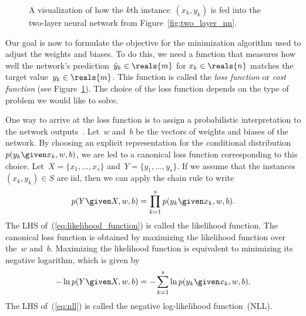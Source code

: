 \documentclass[11pt,a4paper]{article}
\numberwithin{equation}{section}
\begin{document}
\begin{figure}
\caption{A visualization of how the $k$th instance~$(x_k, y_k)$ is fed into the
two-layer neural network from
Figure~\ref{fig:two_layer_nn}.\label{fig:nn_with_loss}}
\end{figure}

Our goal is now to formulate the objective for the minimization algorithm used
to adjust the weights and biases. To do this, we need a function that measures
how well the network's prediction~$\hat{y}_k \in \reals{m}$ for $x_k \in
\reals{n}$ matches the target value~$y_k \in \reals{m}$. This function is called
the \emph{loss function} or \emph{cost function} (see
Figure~\ref{fig:nn_with_loss}). The choice of the loss function depends on the
type of problem we would like to solve.

One way to arrive at the loss function is to assign a probabilistic
interpretation to the network outputs~\citep{ml_bishop}. Let~$w$ and~$b$ be the
vectors of weights and biases of the network. By choosing an explicit
representation for the conditional distribution~$p(y_k \given x_k, w, b)$, we
are led to a canonical loss function corresponding to this choice. Let~$X =
\{x_1, \ldots, x_s\}$ and~$Y = \{y_1, \ldots, y_s\}$. If we assume that the
instances~$(x_k, y_k) \in S$ are iid, then we can apply the chain rule to write
\[
	p(Y \given X, w, b) = \prod_{k = 1}^s p(y_k \given x_k, w, b).
	\label{eq:likelihood_function}
\]
The LHS of~(\ref{eq:likelihood_function}) is called the likelihood function. The
canonical loss function is obtained by maximizing the likelihood function over
the~$w$ and~$b$. Maximizing the likelihood function is equivalent to minimizing
its negative logarithm, which is given by
\begin{equation}
	-\ln{p(Y \given X, w, b)} = -\sum_{k = 1}^s \ln{p(y_k \given x_k, w, b)}.
	\label{eq:nll}
\end{equation}
The LHS of~(\ref{eq:nll}) is called the negative log-likelihood function~(NLL).
\end{document}
